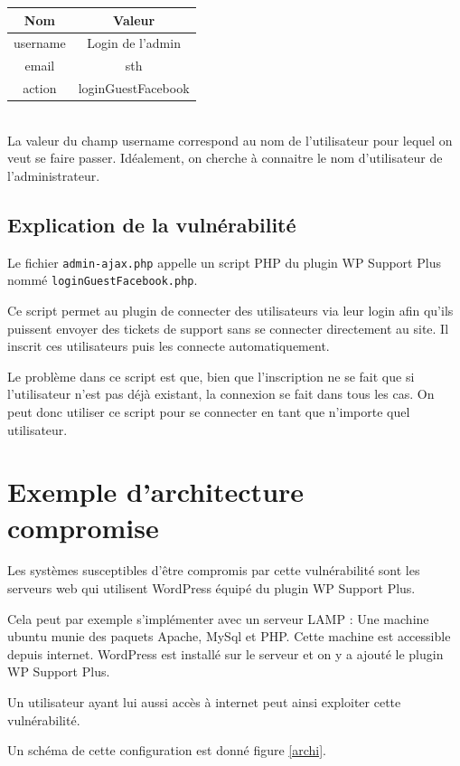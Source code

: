 \documentclass[a4,12pt]{article}
\begin{document}
\begin{tabular}{|c|c|}
  \hline
  Nom & Valeur \\
  \hline
  username & Login de l'admin \\
  email & sth \\
  action & loginGuestFacebook \\
  \hline
\end{tabular}\\

La valeur du champ username correspond au nom de l'utilisateur pour lequel on veut se faire passer. Idéalement, on cherche à connaitre le nom d'utilisateur de l'administrateur. 

\subsection{Explication de la vulnérabilité}

Le fichier \texttt{admin-ajax.php} appelle un script PHP du plugin WP Support Plus nommé \texttt{loginGuestFacebook.php}.

Ce script permet au plugin de connecter des utilisateurs via leur login afin qu'ils puissent envoyer des tickets de support sans se connecter directement au site. Il inscrit ces utilisateurs puis les connecte automatiquement.

Le problème dans ce script est que, bien que l'inscription ne se fait que si l'utilisateur n'est pas déjà existant, la connexion se fait dans tous les cas. On peut donc utiliser ce script pour se connecter en tant que n'importe quel utilisateur.

\section{Exemple d'architecture compromise}

Les systèmes susceptibles d'être compromis par cette vulnérabilité sont les serveurs web qui utilisent WordPress équipé du plugin WP Support Plus.

Cela peut par exemple s'implémenter avec un serveur LAMP : Une machine ubuntu munie des paquets Apache, MySql et PHP. Cette machine est accessible depuis internet. WordPress est installé sur le serveur et on y a ajouté le plugin WP Support Plus.

Un utilisateur ayant lui aussi accès à internet peut ainsi exploiter cette vulnérabilité.

Un schéma de cette configuration est donné figure \ref{archi}.
\end{document}
